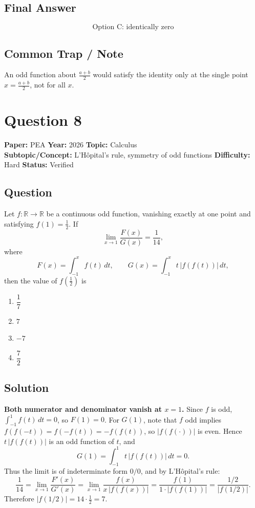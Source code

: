 \documentclass[11pt]{article}
\begin{document}
\subsection*{Final Answer}
\[
\boxed{\text{Option C: identically zero}}
\]

\subsection*{Common Trap / Note}
An odd function about $\tfrac{a+b}{2}$ would satisfy the identity only at the
single point $x = \tfrac{a+b}{2}$, not for all $x$.

\section*{Question 8}
\textbf{Paper:} PEA \quad \textbf{Year:} 2026 \quad \textbf{Topic:} Calculus \\
\textbf{Subtopic/Concept:} L'H\^opital's rule, symmetry of odd functions \quad
\textbf{Difficulty:} Hard \quad \textbf{Status:} Verified

\subsection*{Question}
Let $f:\mathbb{R}\to\mathbb{R}$ be a continuous odd function, vanishing exactly at one point and satisfying $f(1) = \tfrac{1}{2}$. If
\[
\lim_{x\to 1} \frac{F(x)}{G(x)} = \frac{1}{14},
\]
where
\[
F(x) = \int_{-1}^{x} f(t)\,dt, \qquad G(x) = \int_{-1}^{x} t\,|f(f(t))|\,dt,
\]
then the value of $f\!\left(\tfrac{1}{2}\right)$ is
\begin{enumerate}[label=(\Alph*)]
\item $\dfrac{1}{7}$ \item $7$ \item $-7$ \item $\dfrac{7}{2}$
\end{enumerate}

\subsection*{Solution}
\textbf{Both numerator and denominator vanish at $x=1$.}
Since $f$ is odd, $\int_{-1}^{1} f(t)\,dt = 0$, so $F(1) = 0$.
For $G(1)$, note that $f$ odd implies $f(f(-t)) = f(-f(t)) = -f(f(t))$, so
$|f(f(\cdot))|$ is even. Hence $t\,|f(f(t))|$ is an odd function of $t$, and
\[
G(1) = \int_{-1}^{1} t\,|f(f(t))|\,dt = 0.
\]
Thus the limit is of indeterminate form $0/0$, and by L'H\^opital's rule:
\[
\frac{1}{14} = \lim_{x\to 1} \frac{F'(x)}{G'(x)}
= \lim_{x\to 1} \frac{f(x)}{x\,|f(f(x))|}
= \frac{f(1)}{1\cdot |f(f(1))|}
= \frac{1/2}{|f(1/2)|}.
\]
Therefore $|f(1/2)| = 14 \cdot \tfrac{1}{2} = 7$.
\end{document}
